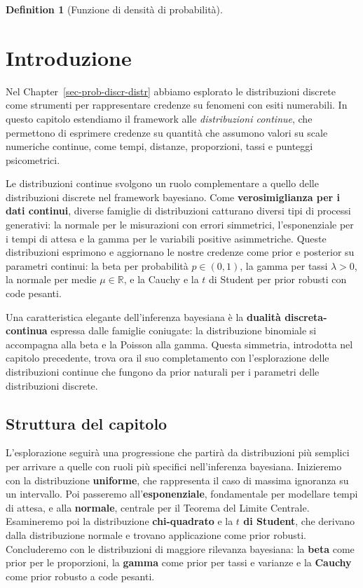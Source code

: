 \documentclass[
  letterpaper,
  DIV=11,
  numbers=noendperiod,
  oneside]{scrreprt}
\theoremstyle{definition}
\theoremstyle{plain}
\theoremstyle{definition}
\newtheorem{definition}{Definition}[chapter]
\theoremstyle{remark}
\begin{document}
\begin{definition}[Funzione di densità di
probabilità]
\begin{tcolorbox}
\end{tcolorbox}

\section*{Introduzione}\label{introduzione-12}


Nel Chapter~\ref{sec-prob-discr-distr} abbiamo esplorato le
distribuzioni discrete come strumenti per rappresentare credenze su
fenomeni con esiti numerabili. In questo capitolo estendiamo il
framework alle \emph{distribuzioni continue}, che permettono di
esprimere credenze su quantità che assumono valori su scale numeriche
continue, come tempi, distanze, proporzioni, tassi e punteggi
psicometrici.

Le distribuzioni continue svolgono un ruolo complementare a quello delle
distribuzioni discrete nel framework bayesiano. Come
\textbf{verosimiglianza per i dati continui}, diverse famiglie di
distribuzioni catturano diversi tipi di processi generativi: la normale
per le misurazioni con errori simmetrici, l'esponenziale per i tempi di
attesa e la gamma per le variabili positive asimmetriche. Queste
distribuzioni esprimono e aggiornano le nostre credenze come prior e
posterior su parametri continui: la beta per probabilità
\(p \in (0,1)\), la gamma per tassi \(\lambda > 0\), la normale per
medie \(\mu \in \mathbb{R}\), e la Cauchy e la \(t\) di Student per
prior robusti con code pesanti.

Una caratteristica elegante dell'inferenza bayesiana è la
\textbf{dualità discreta-continua} espressa dalle famiglie coniugate: la
distribuzione binomiale si accompagna alla beta e la Poisson alla gamma.
Questa simmetria, introdotta nel capitolo precedente, trova ora il suo
completamento con l'esplorazione delle distribuzioni continue che
fungono da prior naturali per i parametri delle distribuzioni discrete.

\subsection*{Struttura del capitolo}\label{struttura-del-capitolo}

L'esplorazione seguirà una progressione che partirà da distribuzioni più
semplici per arrivare a quelle con ruoli più specifici nell'inferenza
bayesiana. Inizieremo con la distribuzione \textbf{uniforme}, che
rappresenta il caso di massima ignoranza su un intervallo. Poi passeremo
all'\textbf{esponenziale}, fondamentale per modellare tempi di attesa, e
alla \textbf{normale}, centrale per il Teorema del Limite Centrale.
Esamineremo poi la distribuzione \textbf{chi-quadrato} e la
\textbf{\(t\) di Student}, che derivano dalla distribuzione normale e
trovano applicazione come prior robusti. Concluderemo con le
distribuzioni di maggiore rilevanza bayesiana: la \textbf{beta} come
prior per le proporzioni, la \textbf{gamma} come prior per tassi e
varianze e la \textbf{Cauchy} come prior robusto a code pesanti.


\end{definition}
\end{document}
